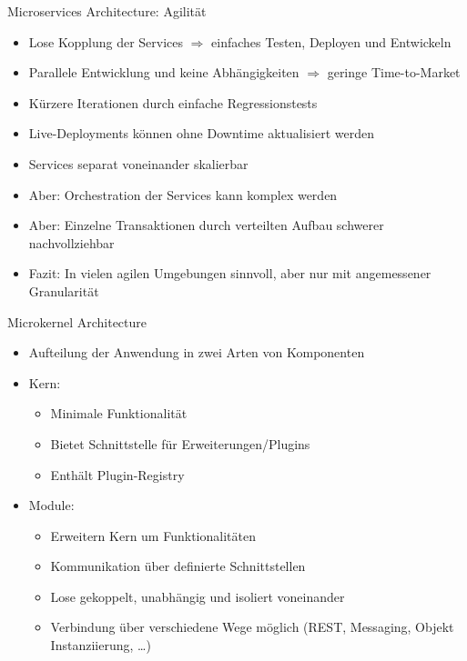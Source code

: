 

\begin{frame}{Microservices Architecture: Agilität}
    \begin{itemize}
        \item Lose Kopplung der Services $\Rightarrow$ einfaches Testen, Deployen und Entwickeln
        \item Parallele Entwicklung und keine Abhängigkeiten $\Rightarrow$ geringe Time-to-Market
        \item Kürzere Iterationen durch einfache Regressionstests
        \item Live-Deployments können ohne Downtime aktualisiert werden
        \item Services separat voneinander skalierbar
        \item Aber: Orchestration der Services kann komplex werden
        \item Aber: Einzelne Transaktionen durch verteilten Aufbau schwerer nachvollziehbar~\cite{architecturePatterns}
        \item Fazit: In vielen agilen Umgebungen sinnvoll, aber nur mit angemessener Granularität
    \end{itemize}
\end{frame}



\begin{frame}{Microkernel Architecture}
    \begin{itemize}
        \item Aufteilung der Anwendung in zwei Arten von Komponenten~\cite{architecturePatterns}
        \item Kern:
        \begin{itemize}
            \item Minimale Funktionalität
            \item Bietet Schnittstelle für Erweiterungen/Plugins
            \item Enthält Plugin-Registry
        \end{itemize}
        \item Module:
        \begin{itemize}
            \item Erweitern Kern um Funktionalitäten
            \item Kommunikation über definierte Schnittstellen
            \item Lose gekoppelt, unabhängig und isoliert voneinander
            \item Verbindung über verschiedene Wege möglich (REST, Messaging, Objekt Instanziierung, \ldots)
            \end{itemize}
    \end{itemize}
\end{frame}

